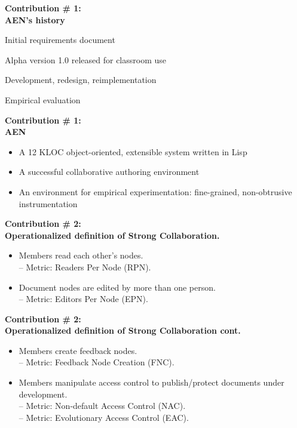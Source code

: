 \begin{slide}\Huge 
  {\bf Contribution \# 1:\\AEN's history}
  \horizontalline\\
  \begin{description}\huge
  \item[June, 1994:] Initial requirements document
  \item[September, 1994:] Alpha version 1.0 released for classroom use
  \item[Fall, 1994:] Development, redesign, reimplementation
  \item[Spring, 1995:] Empirical evaluation
  \end{description}
\end{slide}


\begin{slide}\Huge 
  {\bf Contribution \# 1:\\AEN}
  \horizontalline\\
  \begin{itemize}\huge
  \item A 12 KLOC object-oriented, extensible system written in Lisp 
  \item A successful collaborative authoring environment
  \item An environment for empirical experimentation: fine-grained,
  non-obtrusive instrumentation
  \end{itemize}
\end{slide}


\begin{slide}\Huge 
  {\bf Contribution \# 2:\\Operationalized definition of Strong Collaboration.}
  \horizontalline\\
  \begin{itemize}
  \item Members read each other's nodes.\\
   -- Metric: Readers Per Node (RPN).
  \item{Document nodes are edited by more than one person.}\\
    -- Metric: Editors Per Node (EPN).
  \end{itemize}
\end{slide}


\begin{slide}\Huge 
  {\bf Contribution \# 2:\\Operationalized definition of Strong
  Collaboration cont.}
  \horizontalline\\
  \begin{itemize}\huge
  \item{Members create feedback nodes.}\\
    -- Metric: Feedback Node Creation (FNC).
  \item{Members manipulate access control to publish/protect documents
  under development.}\\
    -- Metric: Non-default Access Control (NAC).\\
    -- Metric: Evolutionary Access Control (EAC).
  \end{itemize}
\end{slide}


